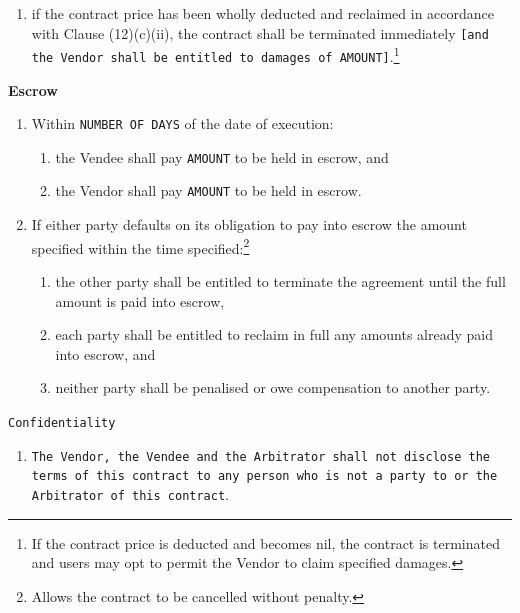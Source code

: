 \documentclass[a4paper,12pt]{article}
\begin{document}
\begin{enumerate}[resume]
\begin{enumerate}
\begin{enumerate}
			\end{enumerate}
			\item if the contract price has been wholly deducted and reclaimed in accordance with Clause (12)(c)(ii), the contract shall be terminated immediately \texttt{[and the Vendor shall be entitled to damages of \colorbox{branding}{AMOUNT}]}.\footnote{If the contract price is deducted and becomes nil, the contract is terminated and users may opt to permit the Vendor to claim specified damages.}
		\end{enumerate}
\end{enumerate}

\textbf{Escrow}

\begin{enumerate}[resume]
	\item Within \texttt{\colorbox{branding}{NUMBER OF DAYS}} of the date of execution:
	\begin{enumerate}
		\item the Vendee shall pay \texttt{\colorbox{branding}{AMOUNT}} to be held in escrow, and
		\item the Vendor shall pay \texttt{\colorbox{branding}{AMOUNT}} to be held in escrow.
	\end{enumerate}
	\item If either party defaults on its obligation to pay into escrow the amount specified within the time specified:\footnote{Allows the contract to be cancelled without penalty.}
	\begin{enumerate}
		\item the other party shall be entitled to terminate the agreement until the full amount is paid into escrow,
		\item each party shall be entitled to reclaim in full any amounts already paid into escrow, and
		\item neither party shall be penalised or owe compensation to another party.
	\end{enumerate}
\end{enumerate}


\texttt{Confidentiality}

\begin{enumerate}[resume]
	\item \texttt{The Vendor, the Vendee and the Arbitrator shall not disclose the terms of this contract to any person who is not a party to or the Arbitrator of this contract}.
\end{enumerate}
\end{document}
